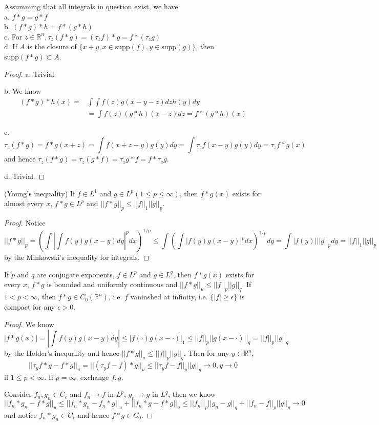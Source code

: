 \documentclass[lang=en, color=blue, ]{elegantbook}
\newcommand{\R}{\mathbb{R}}
\begin{document}
\begin{proposition}
    Assumming that all integrals in question exist, we have\\
    a. $f*g = g*f$ \\
    b. $(f*g)*h = f*(g*h)$ \\
    c. For $z\in\R^n,\tau_z(f*g) = (\tau_zf)*g = f*(\tau_z g)$ \\
    d. If $A$ is the closure of $\{x+y, x\in \text{supp}(f), y\in\text{supp}(g)\}$, then $\text{supp}(f*g)\subset A$.
\end{proposition}
\begin{proof}\par
    a. Trivial.\par
    b. We know
    \[
    \begin{aligned}
        (f*g)*h(x) = &\int \int f(z)g(x-y-z)dz h(y) dy \\
        & =  \int f(z) (g*h)(x-z) dz = f*(g*h)(x)
    \end{aligned}
    \]\par
    c. \[\tau_z(f*g) = f*g(x+z) = \int f(x+z-y)g(y) dy = \int\tau_zf(x-y)g(y)dy = \tau_zf*g(x)\] and hence $\tau_z(f*g) = \tau_z(g*f) = \tau_zg*f = f*\tau_z g$.\par
    d. Trivial.
\end{proof}

\begin{theorem}
    (Young's inequality) If $f\in L^1$ and $g\in L^p(1\leq p\leq \infty)$, then $f*g(x)$ exists for almost every $x$, $f*g\in L^p$ and $||f*g||_p \leq ||f||_1||g||_p$. 
\end{theorem}
\begin{proof}
    Notice
    \[
    ||f*g||_p = (\int |\int f(y)g(x-y) dy|^p dx)^{1/p} \leq \int (\int |f(y)g(x-y)|^p dx)^{1/p}dy = \int |f(y)|||g||_p dy = ||f||_1||g||_p
    \]
    by the Minkowski's inequality for integrals.
\end{proof}

\begin{proposition}
If $p$ and $q$ are conjugate exponents, $f\in L^p$ and $g\in L^q$, then $f*g(x)$ exists for every $x$, $f*g$ is bounded and uniformly continuous and $||f*g||_u \leq ||f||_p||g||_q$. If $1<p<\infty$, then $f*g \in C_0(\R^n)$, i.e. $f$ vaninshed at infinity, i.e. $\{|f|\geq \epsilon\}$ is compact for any $\epsilon > 0$.
\end{proposition}
\begin{proof}
    We know
    \[
    |f*g(x)| = |\int f(y)g(x-y)dy| \leq |f(\cdot)g(x-\cdot)|_1 \leq ||f||_p||g(x-\cdot)||_q = ||f||_p||g||_q
    \]
    by the Holder's inequality and hence $||f*g||_u \leq ||f||_p||g||_q$. Then for any $y\in \R^n$,
    \[||\tau_y f*g - f*g||_u = ||(\tau_y f-f)*g||_u \leq ||\tau_yf-f||_p||g||_q \to 0, y\to 0\]
    if $1\leq p < \infty$. If $p = \infty$, exchange $f,g$.\par
    Consider $f_n,g_n \in C_c$ and $f_n \to f$ in $L^p$, $g_n\to g$ in $L^q$, then we know
    \[
    ||f_n*g_n-f*g||_u \leq ||f_n*g_n - f_n*g||_u + ||f_n*g - f*g||_u \leq ||f_n||_p ||g_n-g||_q + ||f_n-f||_p||g||_q \to 0
    \]
    and notice $f_n*g_n \in C_c$ and hence $f*g \in C_0$. 
\end{proof}
\end{document}
